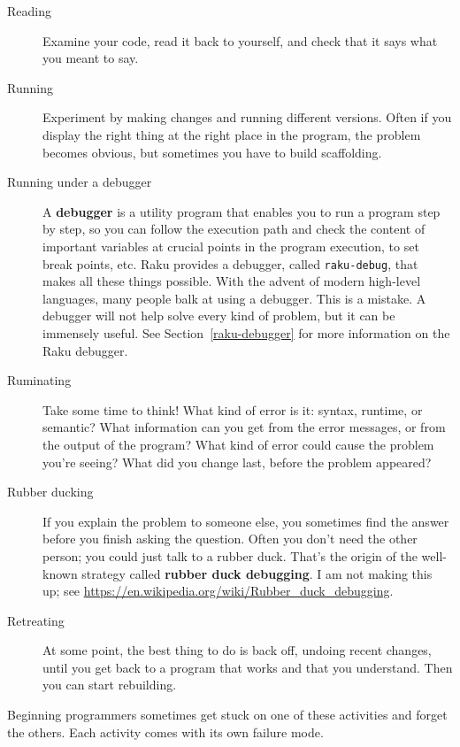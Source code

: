 \begin{description}

\item[Reading] Examine your code, read it back to yourself, and
check that it says what you meant to say.

\item[Running] Experiment by making changes and running different
versions.  Often if you display the right thing at the right place
in the program, the problem becomes obvious, but sometimes you have to
build scaffolding.

\item[Running under a debugger] A {\bf debugger} is a utility 
program that enables you to run a program step by step, 
so you can follow the execution path and check the content of important 
variables at crucial points in the program execution, to set 
break points, etc. Raku provides a debugger, called 
{\tt raku-debug}, that makes all these things possible. With the 
advent of modern high-level languages, many people balk at 
using a debugger. This is a mistake. A debugger will not help 
solve every kind of problem, but it can be immensely 
useful. See Section~\ref{raku-debugger} for more information
on the Raku debugger.

\item[Ruminating] Take some time to think!  What kind of error
is it: syntax, runtime, or semantic?  What information can you get from
the error messages, or from the output of the program?  What kind of
error could cause the problem you're seeing?  What did you change
last, before the problem appeared?

\item[Rubber ducking] If you explain the problem to someone else, you
sometimes find the answer before you finish asking the question.
Often you don't need the other person; you could just talk to a rubber
duck.  That's the origin of the well-known strategy called {\bf
rubber duck debugging}.  I am not making this up; see 
\url{https://en.wikipedia.org/wiki/Rubber_duck_debugging}.

\item[Retreating] At some point, the best thing to do is back
off, undoing recent changes, until you get back to a program that
works and that you understand.  Then you can start rebuilding.

\end{description}

Beginning programmers sometimes get stuck on one of these activities
and forget the others.  Each activity comes with its own failure
mode.

